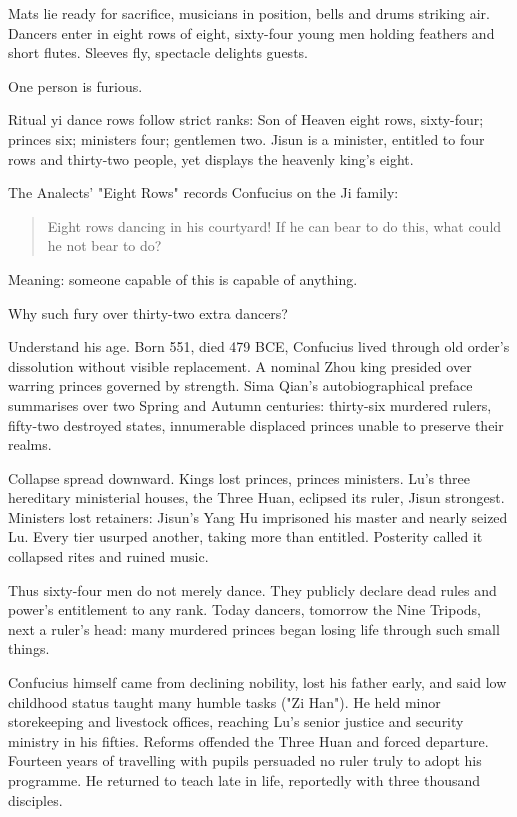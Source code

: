 Mats lie ready for sacrifice, musicians in position, bells and drums striking air. Dancers enter in eight rows of eight, sixty-four young men holding feathers and short flutes. Sleeves fly, spectacle delights guests.

One person is furious.

Ritual yi dance rows follow strict ranks: Son of Heaven eight rows, sixty-four; princes six; ministers four; gentlemen two. Jisun is a minister, entitled to four rows and thirty-two people, yet displays the heavenly king's eight.

The Analects' "Eight Rows" records Confucius on the Ji family:

\begin{quote}
Eight rows dancing in his courtyard! If he can bear to do this, what could he not bear to do?
\end{quote}
Meaning: someone capable of this is capable of anything.

Why such fury over thirty-two extra dancers?

Understand his age. Born 551, died 479 BCE, Confucius lived through old order's dissolution without visible replacement. A nominal Zhou king presided over warring princes governed by strength. Sima Qian's autobiographical preface summarises over two Spring and Autumn centuries: thirty-six murdered rulers, fifty-two destroyed states, innumerable displaced princes unable to preserve their realms.

Collapse spread downward. Kings lost princes, princes ministers. Lu's three hereditary ministerial houses, the Three Huan, eclipsed its ruler, Jisun strongest. Ministers lost retainers: Jisun's Yang Hu imprisoned his master and nearly seized Lu. Every tier usurped another, taking more than entitled. Posterity called it collapsed rites and ruined music.

Thus sixty-four men do not merely dance. They publicly declare dead rules and power's entitlement to any rank. Today dancers, tomorrow the Nine Tripods, next a ruler's head: many murdered princes began losing life through such small things.

Confucius himself came from declining nobility, lost his father early, and said low childhood status taught many humble tasks ("Zi Han"). He held minor storekeeping and livestock offices, reaching Lu's senior justice and security ministry in his fifties. Reforms offended the Three Huan and forced departure. Fourteen years of travelling with pupils persuaded no ruler truly to adopt his programme. He returned to teach late in life, reportedly with three thousand disciples.

